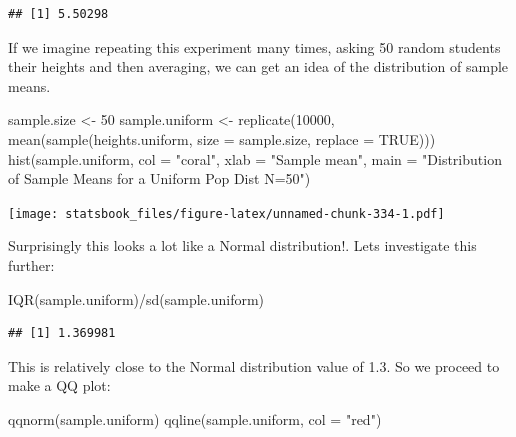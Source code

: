 \documentclass[
]{book}
\newenvironment{Shaded}{\begin{snugshade}}{\end{snugshade}}
\newcommand{\AttributeTok}[1]{\textcolor[rgb]{0.77,0.63,0.00}{#1}}
\newcommand{\ConstantTok}[1]{\textcolor[rgb]{0.00,0.00,0.00}{#1}}
\newcommand{\DecValTok}[1]{\textcolor[rgb]{0.00,0.00,0.81}{#1}}
\newcommand{\FunctionTok}[1]{\textcolor[rgb]{0.00,0.00,0.00}{#1}}
\newcommand{\NormalTok}[1]{#1}
\newcommand{\OtherTok}[1]{\textcolor[rgb]{0.56,0.35,0.01}{#1}}
\newcommand{\SpecialCharTok}[1]{\textcolor[rgb]{0.00,0.00,0.00}{#1}}
\newcommand{\StringTok}[1]{\textcolor[rgb]{0.31,0.60,0.02}{#1}}
\theoremstyle{definition}
\theoremstyle{definition}
\theoremstyle{definition}
\theoremstyle{definition}
\theoremstyle{remark}
\begin{document}
\begin{verbatim}
## [1] 5.50298
\end{verbatim}

If we imagine repeating this experiment many times, asking 50 random students their heights and then averaging, we can get an idea of the distribution of sample means.

\begin{Shaded}
\begin{Highlighting}[]
\NormalTok{sample.size }\OtherTok{\textless{}{-}} \DecValTok{50}
\NormalTok{sample.uniform }\OtherTok{\textless{}{-}} \FunctionTok{replicate}\NormalTok{(}\DecValTok{10000}\NormalTok{, }\FunctionTok{mean}\NormalTok{(}\FunctionTok{sample}\NormalTok{(heights.uniform, }\AttributeTok{size =}\NormalTok{ sample.size,}
    \AttributeTok{replace =} \ConstantTok{TRUE}\NormalTok{)))}
\FunctionTok{hist}\NormalTok{(sample.uniform, }\AttributeTok{col =} \StringTok{"coral"}\NormalTok{, }\AttributeTok{xlab =} \StringTok{"Sample mean"}\NormalTok{, }\AttributeTok{main =} \StringTok{"Distribution of Sample Means for a Uniform Pop Dist N=50"}\NormalTok{)}
\end{Highlighting}
\end{Shaded}

\texttt{[image: statsbook\_files/figure-latex/unnamed-chunk-334-1.pdf]}

Surprisingly this looks a lot like a Normal distribution!. Lets investigate this further:

\begin{Shaded}
\begin{Highlighting}[]
\FunctionTok{IQR}\NormalTok{(sample.uniform)}\SpecialCharTok{/}\FunctionTok{sd}\NormalTok{(sample.uniform)}
\end{Highlighting}
\end{Shaded}

\begin{verbatim}
## [1] 1.369981
\end{verbatim}

This is relatively close to the Normal distribution value of 1.3. So we proceed to make a QQ plot:

\begin{Shaded}
\begin{Highlighting}[]
\FunctionTok{qqnorm}\NormalTok{(sample.uniform)}
\FunctionTok{qqline}\NormalTok{(sample.uniform, }\AttributeTok{col =} \StringTok{"red"}\NormalTok{)}
\end{Highlighting}
\end{Shaded}
\end{document}
